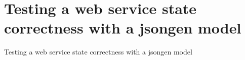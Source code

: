 \section{Testing a web service state correctness with a jsongen model}

\begin{frame}{Testing a web service state correctness with a jsongen model}

\end{frame}